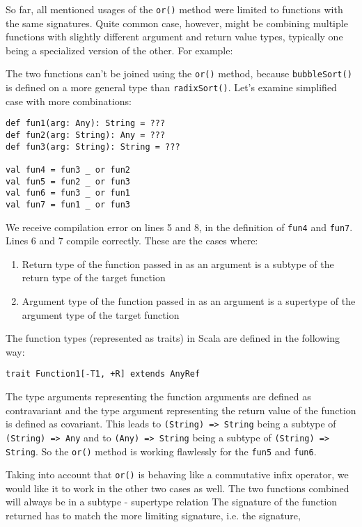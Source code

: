 So far, all mentioned usages of the \lstinline|or()| method were limited to functions with the same signatures. Quite common case, however, might be combining multiple functions with slightly different argument and return value types, typically one being a specialized version of the other. For example:


The two functions can't be joined using the \lstinline|or()| method, because \lstinline|bubbleSort()| is defined on a more general type than \lstinline|radixSort()|. Let's examine simplified case with more combinations:

\lstset{style=Scala}
\begin{lstlisting}
def fun1(arg: Any): String = ???
def fun2(arg: String): Any = ???
def fun3(arg: String): String = ???

val fun4 = fun3 _ or fun2
val fun5 = fun2 _ or fun3
val fun6 = fun3 _ or fun1
val fun7 = fun1 _ or fun3
\end{lstlisting}

We receive compilation error on lines 5 and 8, in the definition of \lstinline|fun4| and \lstinline|fun7|. Lines 6 and 7 compile correctly. These are the cases where:

\begin{enumerate}
	\item Return type of the function passed in as an argument is a subtype of the return type of the target function
	\item Argument type of the function passed in as an argument is a supertype of the argument type of the target function
\end{enumerate}

The function types (represented as traits) in Scala are defined in the following way:
\lstset{style=Scala}
\begin{lstlisting}
trait Function1[-T1, +R] extends AnyRef
\end{lstlisting}

The type arguments representing the function arguments are defined as contravariant and the type argument representing the return value of the function is defined as covariant. This leads to \lstinline|(String) => String| being a subtype of \lstinline|(String) => Any| and to \lstinline|(Any) => String| being a subtype of \lstinline|(String) => String|. So the \lstinline|or()| method is working flawlessly for the \lstinline|fun5| and \lstinline|fun6|.

Taking into account that \lstinline|or()| is behaving like a commutative infix operator, we would like it to work in the other two cases as well. The two functions combined will always be in a subtype - supertype relation The signature of the function returned has to match the more limiting signature, i.e. the signature,

